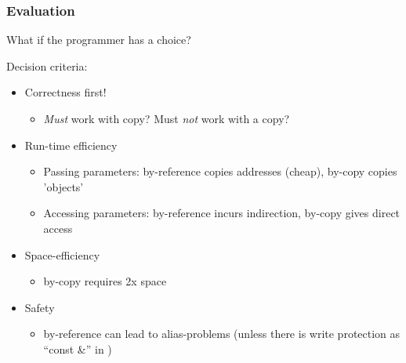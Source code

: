 \documentclass{beamer}
\begin{document}
\begin{frame}[fragile]
\frametitle{Evaluation}
What if the programmer has a choice?
\bigskip

Decision criteria:
\begin{itemize}
\item Correctness first! 
\begin{itemize}
\item \textit{Must} work with copy? Must \textit{not} work with a copy?
\end{itemize}
\item Run-time efficiency
\begin{itemize}
\item Passing parameters: by-reference copies addresses (cheap), by-copy
copies 'objects'
\item Accessing parameters: by-reference incurs indirection, by-copy
gives direct access
\end{itemize}
\item Space-efficiency
\begin{itemize}
\item by-copy requires 2x space
\end{itemize}
\item Safety 
\begin{itemize}
\item by-reference can lead to alias-problems (unless there is
write protection as ``const \&'' in \Cpp)
\end{itemize}
\end{itemize}



\begin{cplus3}
\end{cplus3}
\end{frame}
\end{document}
